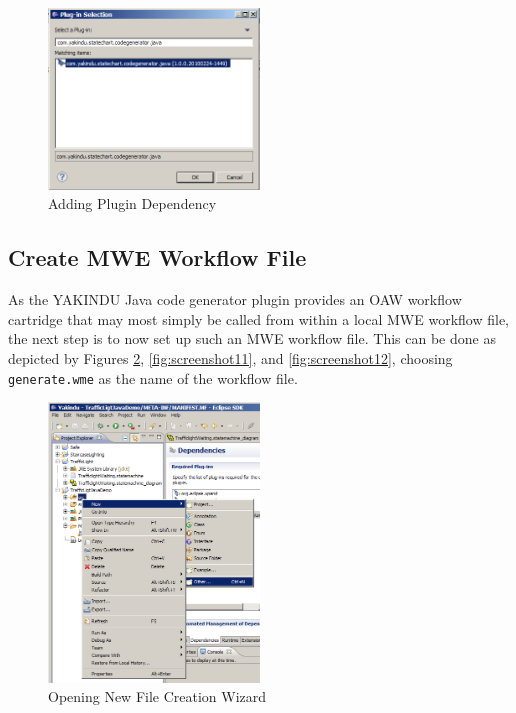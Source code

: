 \begin{figure}[h!]
\center
\includegraphics[width=0.5\textwidth]{./Pictures/Screenshot9}
\caption{\label{fig:screenshot9} Adding Plugin Dependency}
\end{figure}

\clearpage
\subsection{Create MWE Workflow File}
As the YAKINDU Java code generator plugin provides an OAW workflow cartridge
that may most simply be called from within a local MWE workflow file, the next
step is to now set up such an MWE workflow file. This can be done as depicted
by Figures \ref{fig:screenshot10}, \ref{fig:screenshot11}, and
\ref{fig:screenshot12}, choosing \texttt{generate.wme} as the name of the
workflow file.

\begin{figure}[h!]
\center
\includegraphics[width=0.5\textwidth]{./Pictures/Screenshot10}
\caption{\label{fig:screenshot10} Opening New File Creation Wizard}
\end{figure}

